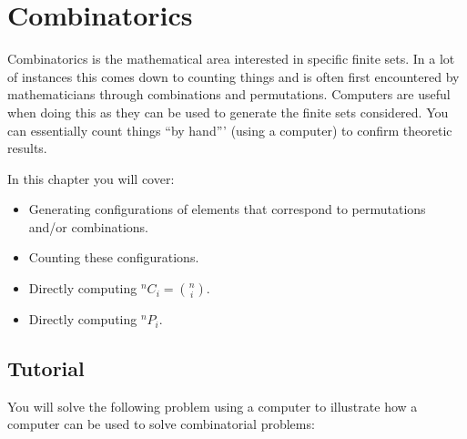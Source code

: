 \chapter{Combinatorics}
\label{chp:combinatorics}

Combinatorics is the mathematical area interested in specific finite sets. In a lot
of instances this comes down to counting things and is often first encountered
by mathematicians through combinations and permutations.
Computers are useful when doing this as they can be used to generate the finite
sets considered. You can essentially count things ``by hand''' (using a computer)
to confirm theoretic results.


\begin{note}
In this chapter you will cover:
\begin{itemize}
\item 

Generating configurations of elements that correspond to permutations and/or
combinations.

\item 

Counting these configurations.

\item 

Directly computing \(^n C_i={n \choose i}\).

\item 

Directly computing \(^n P_i\).

\end{itemize}
\end{note}





\section{Tutorial}
\label{\detokenize{tools-for-mathematics/05-combinations-permutations/tutorial/main:tutorial}}\label{\detokenize{tools-for-mathematics/05-combinations-permutations/tutorial/main::doc}}

You will solve the following problem using a computer to illustrate how a
computer can be used to solve combinatorial problems:



